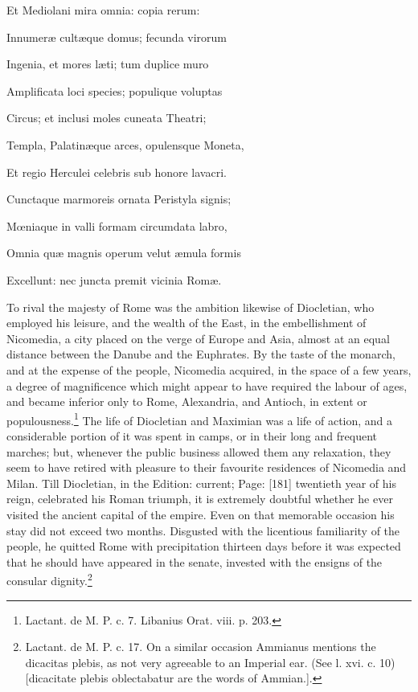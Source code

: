 {Et Mediolani mira omnia: copia rerum:

Innumeræ cultæque domus; fecunda virorum

Ingenia, et mores læti; tum duplice muro

Amplificata loci species; populique voluptas

Circus; et inclusi moles cuneata Theatri;

Templa, Palatinæque arces, opulensque Moneta,

Et regio Herculei celebris sub honore lavacri.

Cunctaque marmoreis ornata Peristyla signis;

Mœniaque in valli formam circumdata labro,

Omnia quæ magnis operum velut æmula formis

Excellunt: nec juncta premit vicinia Romæ.} To rival the majesty of Rome was the ambition likewise of Diocletian, who employed his leisure, and the wealth of the East, in the embellishment of Nicomedia, a city placed on the verge of Europe and Asia, almost at an equal distance between the Danube and the Euphrates. By the taste of the monarch, and at the expense of the people, Nicomedia acquired, in the space of a few years, a degree of magnificence which might appear to have required the labour of ages, and became inferior only to Rome, Alexandria, and Antioch, in extent or populousness.\footnote{Lactant. de M. P. c. 7. Libanius Orat. viii. p. 203.} The life of Diocletian and Maximian was a life of action, and a considerable portion of it was spent in camps, or in their long and frequent marches; but, whenever the public business allowed them any relaxation, they seem to have retired with pleasure to their favourite residences of Nicomedia and Milan. Till Diocletian, in the Edition: current; Page: [181] twentieth year of his reign, celebrated his Roman triumph, it is extremely doubtful whether he ever visited the ancient capital of the empire. Even on that memorable occasion his stay did not exceed two months. Disgusted with the licentious familiarity of the people, he quitted Rome with precipitation thirteen days before it was expected that he should have appeared in the senate, invested with the ensigns of the consular dignity.\footnote{Lactant. de M. P. c. 17. On a similar occasion Ammianus mentions the dicacitas plebis, as not very agreeable to an Imperial ear. (See l. xvi. c. 10) [dicacitate plebis oblectabatur are the words of Ammian.].}

